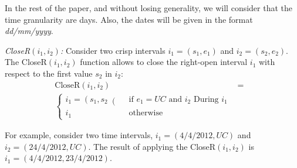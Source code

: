 In the rest of the paper, and without losing generality, we will consider that the time granularity are days. Also, the dates will be given in the format \emph{dd/mm/yyyy}.


\begin{definition}
\emph{CloseR$\left(i_1, i_2\right)$:}
\label{def:close-a-crisp-interval-r}
Consider two crisp intervals $i_1 = \left(s_1, e_1 \right)$ and $i_2 = \left(s_2, e_2\right)$. The CloseR$\left(i_1, i_2 \right)$ function allows to close the right-open interval $i_1$ with respect to the first value $s_2$ in $i_2$:
\begin{align}
\label{eq:close-a-crisp-interval}
\mbox{CloseR} \left( i_1, i_2\right) &=& \\ 
\begin{cases}
\nonumber
i_1 = \left(s_1,s_2 \right( & \mbox{ if } e_1 = UC \mbox{ and } i_2 \mbox{ During } i_1 \\
i_1 & \mbox{ otherwise}
\end{cases}
\end{align}
\end{definition}

For example, consider two time intervals, $i_1 = \left(4/4/2012, UC \right)$ and $i_2 = \left(24/4/2012, UC \right)$. The result of applying the CloseR$\left(i_1, i_2 \right)$ is $i_1 = \left(4/4/2012, 23/4/2012 \right)$.








%



